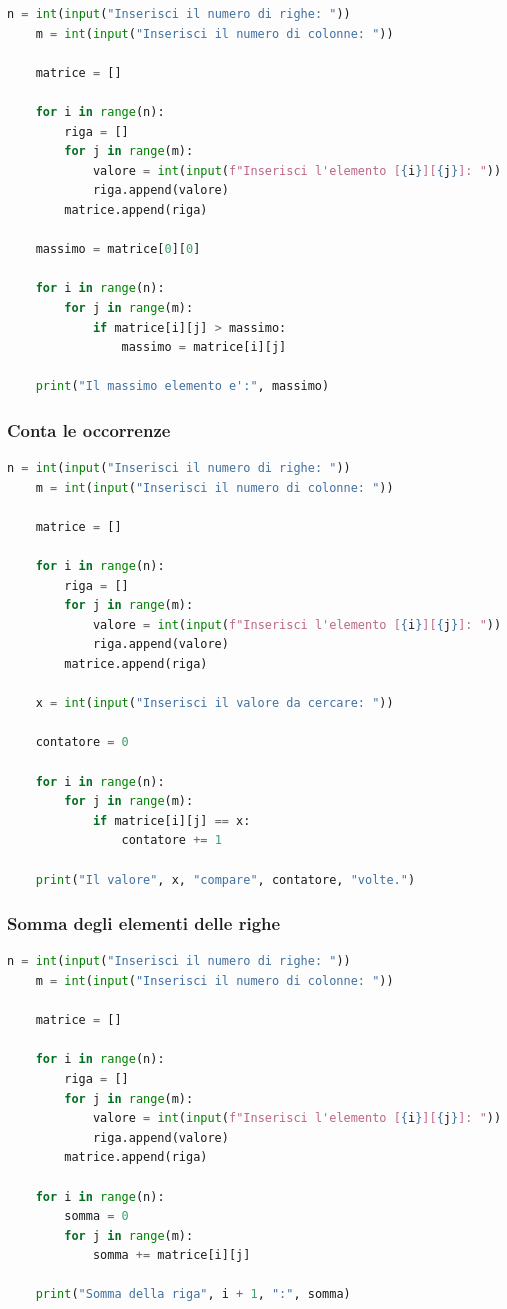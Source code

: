 \documentclass[a4paper,12pt]{article}
\begin{document}
\begin{lstlisting}[language=Python]
	n = int(input("Inserisci il numero di righe: "))
	m = int(input("Inserisci il numero di colonne: "))
	
	matrice = []
	
	for i in range(n):
		riga = []
		for j in range(m):
			valore = int(input(f"Inserisci l'elemento [{i}][{j}]: "))
			riga.append(valore)
		matrice.append(riga)
	
	massimo = matrice[0][0]
	
	for i in range(n):
		for j in range(m):
			if matrice[i][j] > massimo:
				massimo = matrice[i][j]
	
	print("Il massimo elemento e':", massimo)
\end{lstlisting}

\newpage

\subsubsection{Conta le occorrenze}

\begin{lstlisting}[language=Python]
	n = int(input("Inserisci il numero di righe: "))
	m = int(input("Inserisci il numero di colonne: "))
	
	matrice = []
	
	for i in range(n):
		riga = []
		for j in range(m):
			valore = int(input(f"Inserisci l'elemento [{i}][{j}]: "))
			riga.append(valore)
		matrice.append(riga)
	
	x = int(input("Inserisci il valore da cercare: "))
	
	contatore = 0
	
	for i in range(n):
		for j in range(m):
			if matrice[i][j] == x:
				contatore += 1
	
	print("Il valore", x, "compare", contatore, "volte.")
\end{lstlisting}

\newpage

\subsubsection{Somma degli elementi delle righe}

\begin{lstlisting}[language=Python]
	n = int(input("Inserisci il numero di righe: "))
	m = int(input("Inserisci il numero di colonne: "))
	
	matrice = []
	
	for i in range(n):
		riga = []
		for j in range(m):
			valore = int(input(f"Inserisci l'elemento [{i}][{j}]: "))
			riga.append(valore)
		matrice.append(riga)
	
	for i in range(n):
		somma = 0
		for j in range(m):
			somma += matrice[i][j]
	
	print("Somma della riga", i + 1, ":", somma)
\end{lstlisting}
\end{document}
